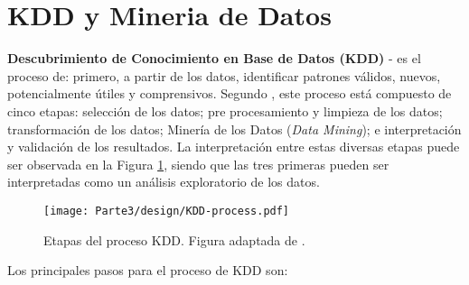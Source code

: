 \section{KDD y Mineria de Datos}\label{sec:kdd-datamining}

\textbf{Descubrimiento de Conocimiento en Base de Datos (KDD)} - es el proceso de: primero, a partir de los datos, identificar patrones válidos, nuevos, potencialmente útiles y comprensivos. Segundo \cite{Fayyad:1996:DMK:257938.257942}, este proceso está compuesto de cinco etapas: selección de los datos; pre procesamiento y limpieza de los datos; transformación de los datos; Minería de los Datos (\textit{Data Mining}); e interpretación y validación de los resultados. La interpretación entre estas diversas etapas puede ser observada en la Figura \ref{fig:processoKDD}, siendo que las tres primeras pueden ser interpretadas como un análisis exploratorio de los datos.

\begin{figure}[htp]
\centering
\texttt{[image: Parte3/design/KDD-process.pdf]}
\caption{Etapas del proceso KDD. Figura adaptada de \cite{Fayyad:1996:DMK:257938.257942}.}
\label{fig:processoKDD}
\end{figure}


Los principales pasos para el proceso de KDD son:

